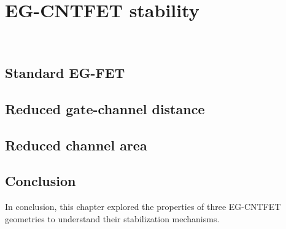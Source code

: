 \chapter{EG-CNTFET stability}
\label{cap:chapter3}



\newpage
\thispagestyle{empty}
\ %
\newpage


\section{Standard EG-FET}
\label{sec:big_channel}




\section{Reduced gate-channel distance}
\label{sec:small_distance}




\section{Reduced channel area}
\label{sec:small_channel}




\section{Conclusion}
\label{sec:stability_conclusion}

In conclusion, this chapter explored the properties of three EG-CNTFET geometries to understand their stabilization mechanisms. 


